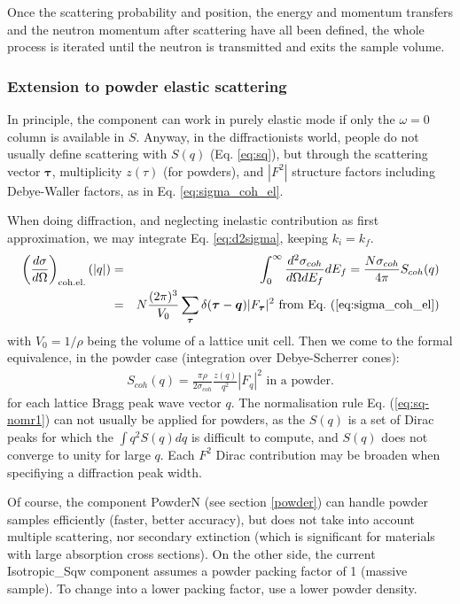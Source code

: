 Once the scattering probability and position, the energy and momentum transfers and the neutron momentum after scattering have all been defined, the whole process is iterated until the neutron is transmitted and exits the sample volume.

\subsubsection{Extension to powder elastic scattering}

In principle, the component can work in purely elastic mode if only the $\omega = 0$ column is available in $S$.
Anyway, in the diffractionists world, people do not usually define scattering with $S(q)$ (Eq. \ref{eq:sq}), but through the scattering vector $\boldsymbol{\tau}$, multiplicity $z(\tau)$ (for powders), and $|F^2|$ structure factors including Debye-Waller factors, as in Eq. \ref{eq:sigma_coh_el}.

When doing diffraction, and neglecting inelastic contribution as first approximation, we may integrate Eq. \ref{eq:d2sigma}, keeping $k_i = k_f$.
\begin{eqnarray}
\left(\frac{d\sigma}{d\Omega}\right)_\textrm{coh.el.}(|q|) &=& \int_0^\infty \frac{d^2\sigma_{coh}}{d\Omega dE_f} dE_f = \frac{N \sigma_{coh}}{4\pi} S_{coh}(q) \\
& = & N\frac{(2\pi)^3}{V_0}\sum_{\boldsymbol{\tau}} \delta(\boldsymbol{\tau} - \boldsymbol{q})|F_{\boldsymbol{\tau}}|^2 \textrm{\ from\ Eq.\ (\ref{eq:sigma_coh_el})}
\end{eqnarray}
with $V_0 = 1/\rho$ being the volume of a lattice unit cell. Then we come to the formal equivalence, in the powder case \cite{squires} (integration over Debye-Scherrer cones):
\begin{eqnarray}\label{eq:sq-F2}
S_{coh}(q) = \frac{\pi \rho}{2\sigma_{coh}} \frac{z(q)}{q^2} |F_q|^2 \textrm{\ in\ a\ powder.}
\end{eqnarray}
for each lattice Bragg peak wave vector $q$.
The normalisation rule Eq. (\ref{eq:sq-nomr1}) can not usually be applied for powders, as the $S(q)$ is a set of Dirac peaks for which the $\int q^2 S(q) dq$ is difficult to compute, and $S(q)$ does not converge to unity for large $q$. Each $F^2$ Dirac contribution may be broaden when specifiying a diffraction peak width.

Of course, the component PowderN (see section \ref{powder}) can handle powder samples efficiently (faster, better accuracy), but does not take into account multiple scattering, nor secondary extinction (which is significant for materials with large absorption cross sections). On the other side, the current Isotropic\_Sqw component assumes a powder packing factor of 1 (massive sample). To change into a lower packing factor, use a lower powder density.

